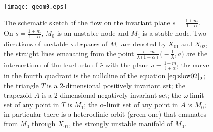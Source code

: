 \documentclass[a4paper,11pt]{article}
\theoremstyle{remark}
\begin{document}
\begin{figure}[ht]
 \centering
  \texttt{[image: geom0.eps]} \label{fig:flow0}
  \caption{The schematic sketch of the flow on the invariant plane $s=\frac{1+m}{1+\alpha}$.   On $s=\frac{1+m}{1+\alpha}$, $M_0$ is an unstable node and $M_1$ is a stable node. Two directions of unstable subspaces of $M_0$ are denoted by $X_{01}$ and $X_{02}$; the straight lines emanating from the 
  point $\frac{\alpha-m}{\lambda(1+\alpha)}\big(-\frac{1}{\lambda},a\big)$ are the intersections of the level sets of $\hat{r}$ 
  with the plane $s=\frac{1+m}{1+\alpha}$; the curve in the fourth quadrant is the nullcline of the equation $\eqref{eq:slow02}_2$; the triangle $T$ is a 2-dimensional positively invariant set; the trapezoid $A$ is a 2-dimensional negatively invariant set; the $\omega$-limit set of any point in $T$ is $M_1$; 
  the $\alpha$-limit set of any point in $A$ is $M_0$; in particular there is a heteroclinic orbit (green one) that emanates from $M_0$ through $X_{01}$, the strongly unstable manifold of $M_0$.} 
\end{figure}
\end{document}
